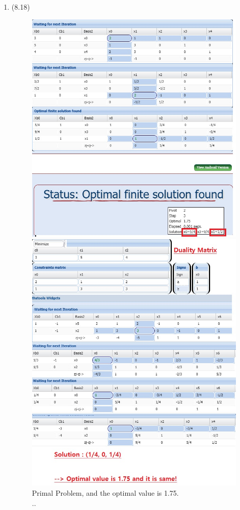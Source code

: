 \documentclass[letterpaper,12pt]{article}
\theoremstyle{definition}
\begin{document}
\begin{enumerate}
	\item (8.18) \\
\begin{figure}[htbp]
\begin{center}
    \includegraphics[scale=0.35]{8p18a}
    \caption{Primal Problem, and the optimal value is 1.75. \\ ..} \label{fig:}
    \includegraphics[scale=0.35]{8p18b}

\end{center}
\end{figure}
\end{enumerate}
\end{document}
